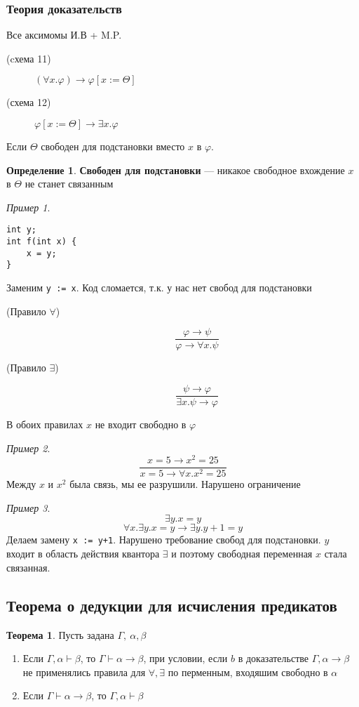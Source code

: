 \documentclass[english]{article}
\theoremstyle{plain}
\theoremstyle{remark}
\newtheorem*{examp}{Пример}
\theoremstyle{definition}
\newtheorem{theorem}{Теорема}[section]
\newtheorem*{definition}{Определение}
\begin{document}
\subsubsection{Теория доказательств}
\label{sec:org0b7c749}
Все аксимомы И.В + M.P.
\begin{description}
\item[{(cхема 11)}] \((\forall x. \varphi) \to \varphi[x:=\Theta]\)
\item[{(схема 12)}] \(\varphi[x:=\Theta]\to \exists x. \varphi\)
\end{description}
Если \(\Theta\) свободен для подстановки вместо \(x\) в \(\varphi\).
\begin{definition}
\textbf{Свободен для подстановки} --- никакое свободное вхождение \(x\) в \(\Theta\) не станет связанным
\end{definition}
\begin{examp}
\-
\begin{verbatim}
int y;
int f(int x) {
	x = y;
}
\end{verbatim}
Заменим \texttt{y := x}. Код сломается, т.к. у нас нет свобод для подстановки
\end{examp}
\begin{description}
\item[{(Правило \(\forall\))}] \[\frac{\varphi \to \psi}{\varphi \to \forall x. \psi}\]
\item[{(Правило \(\exists\))}] \[ \frac{\psi \to \varphi}{\exists x.\psi \to \varphi} \]
\end{description}
В обоих правилах \(x\) не входит свободно в \(\varphi\)
\begin{examp}
\[ \frac{x = 5 \to x^2 = 25}{x = 5 \to \forall x. x^2 = 25} \]
Между \(x\) и \(x^2\) была связь, мы ее разрушили. Нарушено ограничение
\end{examp}
\begin{examp}
\[ \exists y. x = y \]
\[ \forall x. \exists y. x = y \to \exists y. y + 1 = y \]
Делаем замену \texttt{x := y+1}. Нарушено требование свобод для подстановки. \(y\) входит в область действия квантора \(\exists\) и поэтому свободная переменная \(x\) стала связанная.
\end{examp}
\subsection{Теорема о дедукции для исчисления предикатов}
\label{sec:orgdb8104c}
\begin{theorem}
Пусть задана \(\Gamma,\ \alpha,\beta\)
\begin{enumerate}
\item Если \(\Gamma, \alpha \vdash \beta\), то \(\Gamma \vdash \alpha \to \beta\), при условии, если \(b\) в доказательстве \(\Gamma, \alpha \to \beta\) не применялись правила для \(\forall, \exists\) по перменным, входяшим свободно в \(\alpha\)
\item Если \(\Gamma \vdash \alpha \to \beta\), то \(\Gamma, \alpha \vdash \beta\)
\end{enumerate}
\label{org171e6ce}
\end{theorem}
\end{document}
